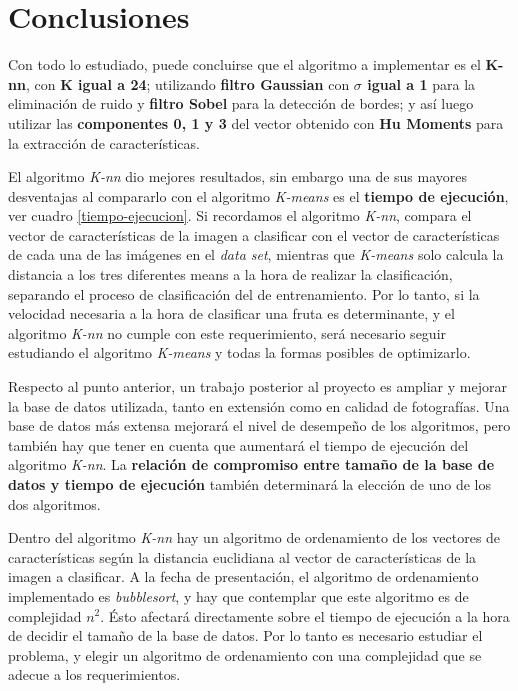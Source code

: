 \documentclass[10pt,a4paper]{article}
\begin{document}
\section{Conclusiones}
Con todo lo estudiado, puede concluirse que el algoritmo a implementar es el \textbf{K-nn}, con \textbf{K igual a 24}; utilizando \textbf{filtro Gaussian} con \textbf{$\sigma$ igual a 1} para la eliminación de ruido y \textbf{filtro Sobel} para la detección de bordes; y así luego utilizar las \textbf{componentes 0, 1 y 3} del vector obtenido con \textbf{Hu Moments} para la extracción de características.

El algoritmo \textit{K-nn} dio mejores resultados, sin embargo una de sus mayores desventajas al compararlo con el algoritmo \textit{K-means} es el \textbf{tiempo de ejecución}, ver cuadro \ref{tiempo-ejecucion}. Si recordamos el algoritmo \textit{K-nn}, compara el vector de características de la imagen a clasificar con el vector de características de cada una de las imágenes en el \textit{data set}, mientras que \textit{K-means} solo calcula la distancia a los tres diferentes means a la hora de realizar la clasificación, separando el proceso de clasificación del de entrenamiento. Por lo tanto, si la velocidad necesaria a la hora de clasificar una fruta es determinante, y el algoritmo \textit{K-nn} no cumple con este requerimiento, será necesario seguir estudiando el algoritmo \textit{K-means} y todas la formas posibles de optimizarlo.

Respecto al punto anterior, un trabajo posterior al proyecto es ampliar y mejorar la base de datos utilizada, tanto en extensión como en calidad de fotografías. Una base de datos más extensa mejorará el nivel de desempeño de los algoritmos, pero también hay que tener en cuenta que aumentará el tiempo de ejecución del algoritmo \textit{K-nn}. La \textbf{relación de compromiso entre tamaño de la base de datos y tiempo de ejecución} también determinará la elección de uno de los dos algoritmos.

Dentro del algoritmo \textit{K-nn} hay un algoritmo de ordenamiento de los vectores de características según la distancia euclidiana al vector de características de la imagen a clasificar. A la fecha de presentación, el algoritmo de ordenamiento implementado es \textit{bubblesort}, y hay que contemplar que este algoritmo es de complejidad $n^{2}$. Ésto afectará directamente sobre el tiempo de ejecución a la hora de decidir el tamaño de la base de datos. Por lo tanto es necesario estudiar el problema, y elegir un algoritmo de ordenamiento con una complejidad que se adecue a los requerimientos.
\end{document}
